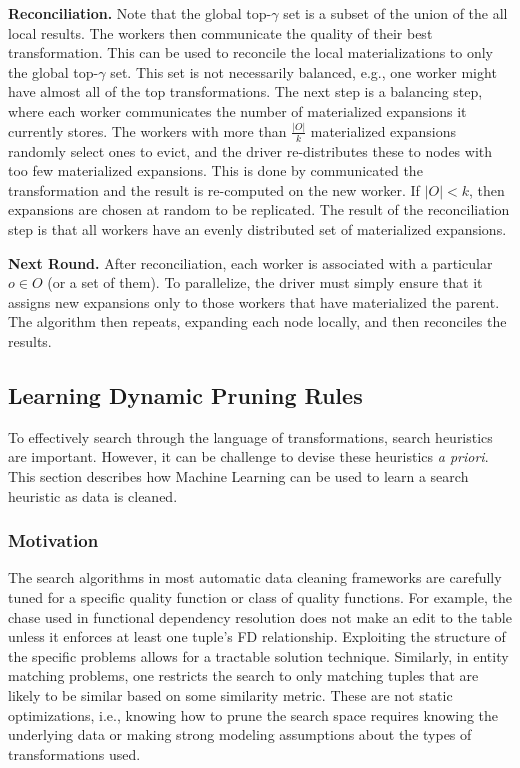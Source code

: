 \vspace{0.25em} \noindent  \textbf{Reconciliation. }  Note that the global top-$\gamma$ set is a subset of the union of the all local results.
The workers then communicate the quality of their best transformation. This can be used to reconcile the local materializations to only the global top-$\gamma$ set.
This set is not necessarily balanced, e.g., one worker might have almost all of the top transformations.
The next step is a balancing step, where each worker communicates the number of materialized expansions it currently stores.
The workers with more than $\frac{|O|}{k}$ materialized expansions  randomly select ones to evict, and the driver re-distributes these to nodes with too few materialized expansions.
This is done by communicated the transformation and the result is re-computed on the new worker.
If $|O| < k$, then expansions are chosen at random to be replicated.
The result of the reconciliation step is that all workers have an evenly distributed set of materialized expansions.

\vspace{0.25em} \noindent  \textbf{Next Round. } After reconciliation, each worker is associated with a particular $o \in O$ (or a set of them). To parallelize, the driver must simply ensure that it assigns new expansions only to those workers that have materialized the parent.
The algorithm then repeats, expanding each node locally, and then reconciles the results.









\subsection{Learning Dynamic Pruning Rules}\label{s:dynlearn}
To effectively search through the language of transformations, search heuristics are important.
However, it can be challenge to devise these heuristics \emph{a priori}.
This section describes how Machine Learning can be used to learn a search heuristic as data is cleaned.

\subsubsection{Motivation}
The search algorithms in  most automatic data cleaning frameworks are carefully tuned for a specific quality function or class of quality functions. For example, the chase used in functional dependency resolution does not make an edit to the table unless it enforces at least one tuple's FD relationship. Exploiting the structure of the specific problems allows for a tractable solution technique. Similarly, in entity matching problems, one restricts the search to only matching tuples that are likely to be similar based on some similarity metric.
These are not static optimizations, i.e., knowing how to prune the search space requires knowing the underlying data or making strong modeling assumptions about the types of transformations used.

